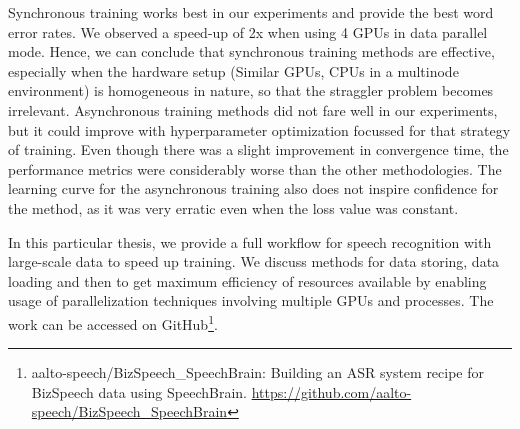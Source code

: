 Synchronous training works best in our experiments and provide the best word error rates. We observed a speed-up of 2x when using 4 GPUs in data parallel mode. Hence, we can conclude that synchronous training methods are effective, especially when the hardware setup (Similar GPUs, CPUs in a multinode environment) is homogeneous in nature, so that the straggler problem becomes irrelevant. Asynchronous training methods did not fare well in our experiments, but it could improve with hyperparameter optimization focussed for that strategy of training.  Even though there was a slight improvement in convergence time, the performance metrics were considerably worse than the other methodologies. The learning curve for the asynchronous training also does not inspire confidence for the method, as it was very erratic even when the loss value was constant. 

In this particular thesis, we provide a full workflow for speech recognition with large-scale data to speed up training. We discuss methods for data storing, data loading and then to get maximum efficiency of resources available by enabling usage of parallelization techniques involving multiple GPUs and processes. The work can be accessed on GitHub\footnote{aalto-speech/BizSpeech\_SpeechBrain: Building an ASR system recipe for BizSpeech data using SpeechBrain. \href{https://github.com/aalto-speech/BizSpeech_SpeechBrain}{https://github.com/aalto-speech/BizSpeech\_SpeechBrain}}.